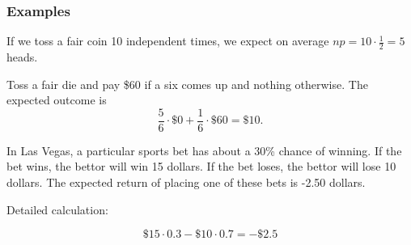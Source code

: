 \documentclass[12pt,a4paper]{article}
\theoremstyle{regla}
\theoremstyle{remark}
\theoremstyle{definition}
\theoremstyle{nonumberbreak}
\begin{document}
\subsubsection{Examples}
\begin{xmpl}
 If we toss a fair coin 10 independent times, we expect on average $np=10\cdot\frac{1}{2}= 5$ heads.
\end{xmpl}
\begin{xmpl}
Toss a fair die and pay \$60 if a six comes up and nothing otherwise. The expected outcome is
$$
\frac{5}{6}\cdot\$0+\frac{1}{6}\cdot\$60= \$10.
$$
\end{xmpl}
\begin{xmpl}

In Las Vegas, a particular sports bet has about a 30\% chance of winning. If the bet wins, the bettor will win 15 dollars. If the bet loses, the bettor will lose 10 dollars.
The expected return of placing one of these bets is -2.50 dollars.

Detailed calculation:


$$\$15\cdot 0.3 - \$10\cdot 0.7 = -\$2.5$$
\end{xmpl}
\end{document}
